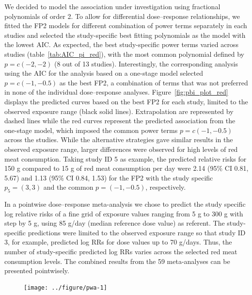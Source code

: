 \documentclass[11pt,a4paper,twoside,openany]{book}\usepackage{knitr}
\begin{document}
{\noindent We decided to model the association under investigation using fractional polynomials of order 2. To allow for differential dose--response relationships, we fitted the FP2 models for different combination of power terms separately in each studies and selected the study-specific best fitting polynomials as the model with the lowest AIC. As expected, the best study-specific power terms varied across studies (table~\ref{tab:AIC_pi_red}), with the most common polynomial defined by $p = c(-2, -2)$ (8 out of 13 studies). Interestingly, the corresponding analysis using the AIC for the analysis based on a one-stage model selected $p = c(-1, -0.5)$ as the best FP2, a combination of terms that was not preferred in none of the individual dose--response analyses. Figure~\ref{fig:pbi_plot_red} displays the predicted curves based on the best FP2 for each study, limited to the observed exposure range (black solid lines). Extrapolation are represented by dashed lines while the red curves represent the predicted association from the one-stage model, which imposed the common power terms $p = c(-1, -0.5)$ across the studies. While the alternative strategies gave similar results in the observed exposure range, larger differences were observed for high levels of red meat consumption. Taking study ID 5 as example, the predicted relative risks for 150 g compared to 15 g of red meat consumption per day were 2.14 (95\% CI 0.81, 5.67) and 1.13 (95\% CI 0.84, 1.53) for the FP2 with the study specific $p_5 = (3, 3)$ and the common $p = (-1, -0.5)$, respectively. 

\noindent In a pointwise dose--response meta-analysis we chose to predict the study specific log relative risks of a fine grid of exposure values ranging from 5 g to 300 g with step by 5 g, using 85 g/day (median reference dose value) as referent. The study-specific predictions were limited to the observed exposure range so that study ID 3, for example, predicted log RRs for dose values up to 70 g/days. Thus, the number of study-specific predicted log RRs varies across the selected red meat consumption levels. 
The combined results from the 59 meta-analyses can be presented pointwisely. 

\begin{knitrout}\footnotesize
{}\color{fgcolor}\begin{figure}[h]

{\centering \texttt{[image: ../figure/pwa-1]} 

}


\end{figure}
\end{knitrout}}
\end{document}
